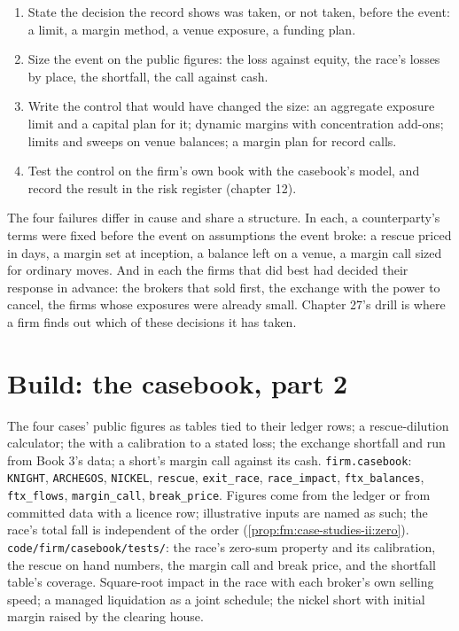 \begin{method}\label{met:fm:case-studies-ii:control}
\begin{enumerate}
\item State the decision the record shows was taken, or not taken, before the event: a limit, a margin method, a venue exposure, a funding plan.
\item Size the event on the public figures: the loss against equity, the race's losses by place, the shortfall, the call against cash.
\item Write the control that would have changed the size: an aggregate exposure limit and a capital plan for it; dynamic margins with concentration
add-ons; limits and sweeps on venue balances; a margin plan for record calls.
\item Test the control on the firm's own book with the casebook's model, and record the result in the risk register (chapter 12).
\end{enumerate}
\end{method}

The four failures differ in cause and share a structure. In each, a counterparty's terms were fixed before the event on assumptions the event broke: a
rescue priced in days, a margin set at inception, a balance left on a venue, a margin call sized for ordinary moves. And in each the firms that did
best had decided their response in advance: the brokers that sold first, the exchange with the power to cancel, the firms whose exposures were already
small. Chapter 27's drill is where a firm finds out which of these decisions it has taken.

\section{Build: the casebook, part 2}\label{bld:fm:case-studies-ii:casebook}

\begin{build}
 The four cases' public figures as tables tied to their ledger rows; a rescue-dilution calculator; the  with a calibration
to a stated loss; the exchange shortfall and run from Book 3's data; a short's margin call against its cash.
 \texttt{firm.casebook}: \texttt{KNIGHT}, \texttt{ARCHEGOS}, \texttt{NICKEL}, \texttt{rescue}, \texttt{exit\_race},
\texttt{race\_impact}, \texttt{ftx\_balances}, \texttt{ftx\_flows}, \texttt{margin\_call}, \texttt{break\_price}.
 Figures come from the ledger or from committed data with a licence row; illustrative inputs are named as such; the race's total fall is
independent of the order (\cref{prop:fm:case-studies-ii:zero}).
 \texttt{code/firm/casebook/tests/}: the race's zero-sum property and its calibration, the rescue on hand numbers, the margin
call and break price, and the shortfall table's coverage.
 Square-root impact in the race with each broker's own selling speed; a managed liquidation as a joint schedule; the nickel short
with initial margin raised by the clearing house.
\end{build}

